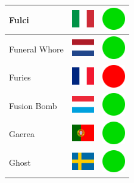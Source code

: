 \documentclass[12pt, a4paper, twoside]{report}
\begin{document}
\begin{center}
\begin{longtable}{|p{5cm}|p{2cm}|p{2cm}|}
Fulci & \includegraphics[width=1cm]{4x3/it} & \includegraphics[width=1cm]{likes/y} \\ \hline
Funeral Whore & \includegraphics[width=1cm]{4x3/nl} & \includegraphics[width=1cm]{likes/y} \\ \hline
Furies & \includegraphics[width=1cm]{4x3/fr} & \includegraphics[width=1cm]{likes/n} \\ \hline
Fusion Bomb & \includegraphics[width=1cm]{4x3/lu} & \includegraphics[width=1cm]{likes/y} \\ \hline
Gaerea & \includegraphics[width=1cm]{4x3/pt} & \includegraphics[width=1cm]{likes/y} \\ \hline
Ghost & \includegraphics[width=1cm]{4x3/se} & \includegraphics[width=1cm]{likes/y} \\ \hline

\end{longtable}
\end{center}
\end{document}
